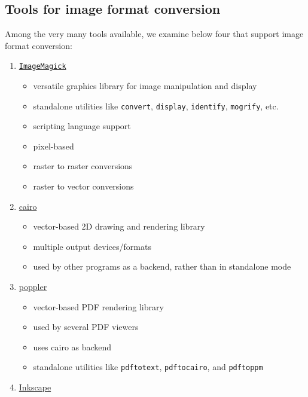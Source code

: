 \documentclass[
  11pt,
  british,
  a4paper,
]{article}
\providecommand{\tightlist}{%
  \setlength{\itemsep}{0pt}\setlength{\parskip}{0pt}}
\begin{document}
\hypertarget{tools-for-image-format-conversion}{%
\subsection{Tools for image format
conversion}\label{tools-for-image-format-conversion}}

Among the very many tools available, we examine below four that support
image format conversion:

\begin{enumerate}
\tightlist
\item
  \href{https://imagemagick.org/index.php}{\texttt{ImageMagick}}

  \begin{itemize}
  \tightlist
  \item
    versatile graphics library for image manipulation and display
  \item
    standalone utilities like \texttt{convert}, \texttt{display},
    \texttt{identify}, \texttt{mogrify}, etc.
  \item
    scripting language support
  \item
    pixel-based
  \item
    raster to raster conversions
  \item
    raster to vector conversions
  \end{itemize}
\item
  \href{https://www.cairographics.org/}{cairo}

  \begin{itemize}
  \tightlist
  \item
    vector-based 2D drawing and rendering library
  \item
    multiple output devices/formats
  \item
    used by other programs as a backend, rather than in standalone mode
  \end{itemize}
\item
  \href{https://poppler.freedesktop.org/}{poppler}

  \begin{itemize}
  \tightlist
  \item
    vector-based PDF rendering library
  \item
    used by several PDF viewers
  \item
    uses cairo as backend
  \item
    standalone utilities like \texttt{pdftotext}, \texttt{pdftocairo},
    and \texttt{pdftoppm}
  \end{itemize}
\item
  \href{https://inkscape.org/}{Inkscape}


\end{enumerate}
\end{document}
